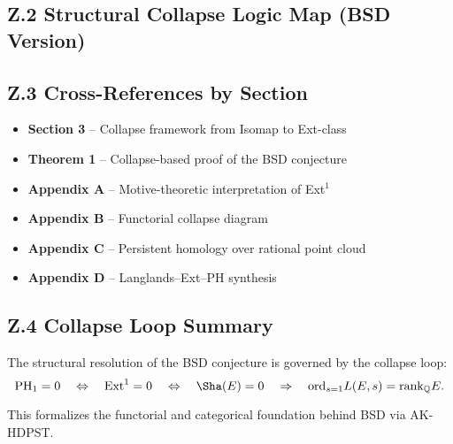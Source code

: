 \subsection*{Z.2 Structural Collapse Logic Map (BSD Version)}

\begin{center}
\end{center}

\subsection*{Z.3 Cross-References by Section}

\begin{itemize}
  \item \textbf{Section 3} – Collapse framework from Isomap to Ext-class
  \item \textbf{Theorem 1} – Collapse-based proof of the BSD conjecture
  \item \textbf{Appendix A} – Motive-theoretic interpretation of Ext$^1$
  \item \textbf{Appendix B} – Functorial collapse diagram
  \item \textbf{Appendix C} – Persistent homology over rational point cloud
  \item \textbf{Appendix D} – Langlands–Ext–PH synthesis
\end{itemize}

\subsection*{Z.4 Collapse Loop Summary}

The structural resolution of the BSD conjecture is governed by the collapse loop:
\[
\mathrm{PH}_1 = 0 \quad \Leftrightarrow \quad \mathrm{Ext}^1 = 0 \quad \Leftrightarrow \quad \Sha(E) = 0 \quad \Rightarrow \quad \mathrm{ord}_{s=1}L(E,s) = \mathrm{rank}_\mathbb{Q}E.
\]

This formalizes the functorial and categorical foundation behind BSD via AK-HDPST.




